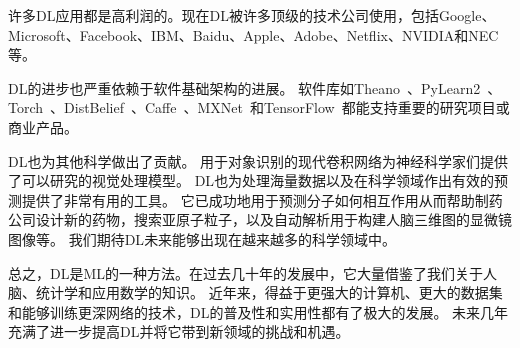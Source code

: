 许多\gls{DL}应用都是高利润的。现在\gls{DL}被许多顶级的技术公司使用，包括Google、Microsoft、Facebook、IBM、Baidu、Apple、Adobe、Netflix、NVIDIA和NEC等。

\gls{DL}的进步也严重依赖于软件基础架构的进展。
软件库如Theano~\citep{bergstra+al:2010-scipy,Bastien-2012}、PyLearn2~\citep{pylearn2_arxiv_2013}、Torch~\citep{Torch-2011}、DistBelief~\citep{Dean-et-al-NIPS2012}、Caffe~\citep{Jia13caffe}、MXNet~\citep{chen2015mxnet}和TensorFlow~\citep{tensorflow}都能支持重要的研究项目或商业产品。

\gls{DL}也为其他科学做出了贡献。
用于对象识别的现代卷积网络为神经科学家们提供了可以研究的视觉处理模型\citep{dicarlo-tutorial-2013}。
\gls{DL}也为处理海量数据以及在科学领域作出有效的预测提供了非常有用的工具。
它已成功地用于预测分子如何相互作用从而帮助制药公司设计新的药物\citep{Dahl-et-al-arxiv2014}，搜索亚原子粒子\citep{baldi2014searching}，以及自动解析用于构建人脑三维图的显微镜图像\citep{knowlesdeep}等。
我们期待\gls{DL}未来能够出现在越来越多的科学领域中。


总之，\gls{DL}是\gls{ML}的一种方法。在过去几十年的发展中，它大量借鉴了我们关于人脑、统计学和应用数学的知识。
近年来，得益于更强大的计算机、更大的数据集和能够训练更深网络的技术，\gls{DL}的普及性和实用性都有了极大的发展。
未来几年充满了进一步提高\gls{DL}并将它带到新领域的挑战和机遇。

